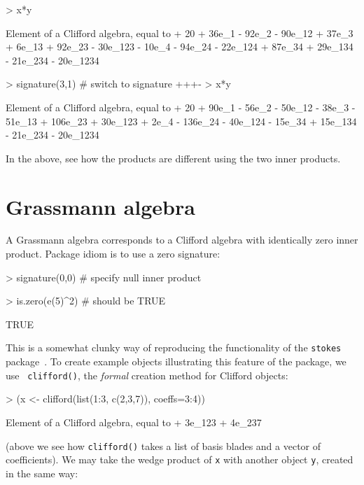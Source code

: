 \documentclass{birkjour}
\theoremstyle{definition}
\theoremstyle{remark}
\numberwithin{equation}{section}
\begin{document}
\begin{Schunk}
\begin{Sinput}
> x*y
\end{Sinput}
\begin{Soutput}
Element of a Clifford algebra, equal to
+ 20 + 36e_1 - 92e_2 - 90e_12 + 37e_3 + 6e_13 + 92e_23 - 30e_123 -
10e_4 - 94e_24 - 22e_124 + 87e_34 + 29e_134 - 21e_234 - 20e_1234
\end{Soutput}
\begin{Sinput}
> signature(3,1)  # switch to signature +++-
> x*y
\end{Sinput}
\begin{Soutput}
Element of a Clifford algebra, equal to
+ 20 + 90e_1 - 56e_2 - 50e_12 - 38e_3 - 51e_13 + 106e_23 + 30e_123 +
2e_4 - 136e_24 - 40e_124 - 15e_34 + 15e_134 - 21e_234 - 20e_1234
\end{Soutput}
\end{Schunk}
%
In the above, see how the products are different using the two inner
products.  

\section{Grassmann algebra}

A Grassmann algebra corresponds to a Clifford algebra with identically
zero inner product.  Package idiom is to use a zero signature:

\begin{Schunk}
\begin{Sinput}
> signature(0,0)  # specify null inner product
\end{Sinput}
\end{Schunk}
\begin{Schunk}
\begin{Sinput}
> is.zero(e(5)^2)     # should be TRUE
\end{Sinput}
\begin{Soutput}
[1] TRUE
\end{Soutput}
\end{Schunk}
%
This is a somewhat clunky way of reproducing the functionality of the
{\tt stokes} package~\cite{hankin2022_stokes_arxiv}.  To create
example objects illustrating this feature of the package, we use {\tt
  clifford()}, the {\em formal} creation method for Clifford objects:

\begin{Schunk}
\begin{Sinput}
> (x <- clifford(list(1:3, c(2,3,7)), coeffs=3:4))
\end{Sinput}
\begin{Soutput}
Element of a Clifford algebra, equal to
+ 3e_123 + 4e_237
\end{Soutput}
\end{Schunk}
%
(above we see how {\tt clifford()} takes a list of basis blades and a
vector of coefficients).  We may take the wedge product of {\tt x} with
another object {\tt y}, created in the same way:
\end{document}
